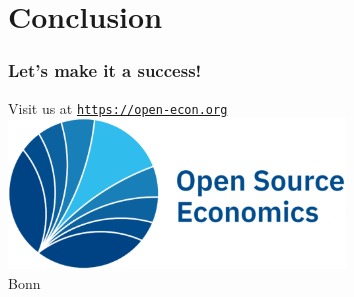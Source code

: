 \section{Conclusion}

\begin{frame}[standout]\frametitle{Let's make it a success!}\vspace{-0.2cm}

Visit us at \href{https://open-econ.org}{\texttt{https://open-econ.org}}\\[0.8cm]

\hspace{3cm}\href{https://open-econ.org}{\includegraphics[height=4cm]{material/crop-ose-logo.pdf}}
\\[-1cm]
\hspace{7.45cm}\textcolor{OSEBlue}{\fontsize{23pt}{20pt}\selectfont Bonn} 




\end{frame}
